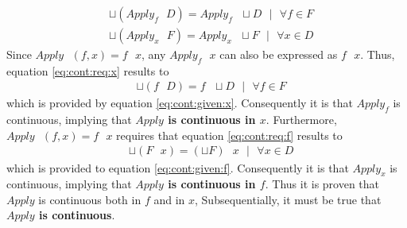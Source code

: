 \begin{align}
	& \sqcup ( Apply_f \text{ } D ) = Apply_f \text{ } \sqcup D \text{ } | \text{ } \forall f \in F \label{eq:cont:req:x} \\
	& \sqcup ( Apply_x \text{ } F ) = Apply_x \text{ } \sqcup F \text{ } | \text{ } \forall x \in D \label{eq:cont:req:f}
\end{align}
Since $Apply \text{ } (f,x) = f \text{ } x$, any $Apply_f \text{ } x$ can also be expressed as $f \text{ } x$. Thus, equation \ref{eq:cont:req:x} results to
\begin{align}
	& \sqcup ( f \text{ } D ) = f \text{ } \sqcup D \text{ } | \text{ } \forall f \in F
\end{align}
which is provided by equation \ref{eq:cont:given:x}. Consequently it is that $Apply_f$ is continuous, implying that	\textbf{$Apply$ is continuous in $x$}. 
Furthermore, $Apply \text{ } (f,x) = f \text{ } x$ requires that equation \ref{eq:cont:req:f} results to
\begin{align}
	& \sqcup ( F \text{ } x ) = (\sqcup F) \text{ } x \text{ } | \text{ } \forall x \in D
\end{align}
which is provided to equation \ref{eq:cont:given:f}. Consequently it is that $Apply_x$ is continuous, implying that	\textbf{$Apply$ is continuous in $f$}. 
Thus it is proven that $Apply$ is continuous both in $f$ and in $x$, Subsequentially, it must be true that \textbf{$Apply$ is continuous}.